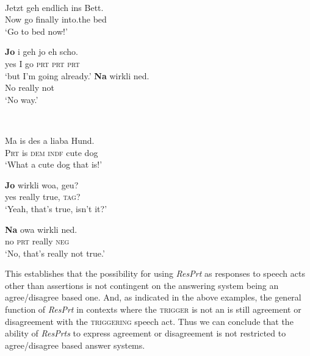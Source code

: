 \documentclass[output=paper]{LSP/langsci}
\begin{document}
\ea\label{ex:wiltschko:51}\settowidth{}
\\
\begin{xlist}
\gll Jetzt geh endlich ins Bett.\\
Now go finally into.the bed\\
\glt ‘Go to bed now!’
\begin{xlisti}
\ex	\gll \textbf{{Jo}}  i geh jo    eh    scho. \\
	yes I go   \textsc{prt} \textsc{prt} \textsc{prt}\\
	\glt ‘but I’m going already.’  
\ex	\gll \textbf{{Na}} wirkli ned. \\
	  No really not \\
      \glt ‘No way.’
\end{xlisti}
\end{xlist}
\z

\ea\label{ex:wiltschko:52}\settowidth{}
\\
\begin{xlist}
\gll Ma   is des a liaba Hund. \\
 \textsc{Prt}  is  \textsc{dem} \textsc{indf} cute dog\\
\glt ‘What a cute dog that is!’
\begin{xlisti}
\ex 	\gll \textbf{{Jo}} wirkli woa, geu? \\
	    yes really true, \textsc{tag}?\\
	    \glt ‘Yeah, that’s true, isn’t it?’
 
\ex      \gll \textbf{{Na}} owa wirkli ned. \\
      no  \textsc{prt}   really \textsc{neg}\\
      \glt ‘No, that’s really not true.’
 
\end{xlisti}
\end{xlist}
\z


This establishes that the possibility for using \textit{ResPrt} as responses to speech acts other than assertions is not contingent on the answering system being an agree/disagree based one.
And, as indicated in the above examples, the general function of \textit{ResPrt} in contexts where the \textsc{trigger} is not an  is still agreement or disagreement with the \textsc{triggering} speech act. Thus we can conclude that the ability of \textit{ResPrts} to express agreement or disagreement is not restricted to agree/disagree based answer systems. 
\end{document}
